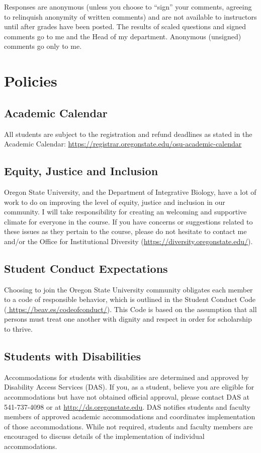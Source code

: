 \documentclass[10pt]{article}
\begin{document}
Responses are anonymous (unless you choose to ``sign'' your comments, 
agreeing to relinquish anonymity of written comments) and are not available to 
instructors until after grades have been posted. 
The results of scaled questions and signed comments go to me and the Head 
of my department.
Anonymous (unsigned) comments go only to me.



\section*{Policies}
\tiny
\subsection*{Academic Calendar}
All students are subject to the registration and refund deadlines as stated in the Academic Calendar: 
\url{https://registrar.oregonstate.edu/osu-academic-calendar}

\subsection*{Equity, Justice and Inclusion}
Oregon State University, and the Department of Integrative Biology, have a lot 
of work to do on improving the level of equity, justice and inclusion in our 
community. 
I will take responsibility for creating an welcoming and supportive climate for 
everyone in the course. 
If you have concerns or suggestions related to these issues as they pertain to 
the course, please do not hesitate to contact me and/or the Office for 
Institutional Diversity
(\href{https://diversity.oregonstate.edu/}{https://diversity.oregonstate.edu/}).

\subsection*{Student Conduct Expectations}
Choosing to join the Oregon State University community obligates each 
member to a code of responsible behavior, which is outlined in the Student 
Conduct Code
(\href{https://beav.es/codeofconduct/}{ https://beav.es/codeofconduct/}).
This Code is based on the assumption that all persons must treat one another 
with dignity and respect in order for scholarship to thrive.

\subsection*{Students with Disabilities}
Accommodations for students with disabilities are determined and approved by 
Disability Access Services (DAS).
If you, as a student, believe you are eligible for accommodations but have not 
obtained official approval, please contact DAS at 541-737-4098 or at
\href{http://ds.oregonstate.edu}{http://ds.oregonstate.edu}.
DAS notifies students and faculty members of approved academic 
accommodations and coordinates implementation of those accommodations.
While not required, students and faculty members are encouraged to discuss 
details of the implementation of individual accommodations.
\end{document}

